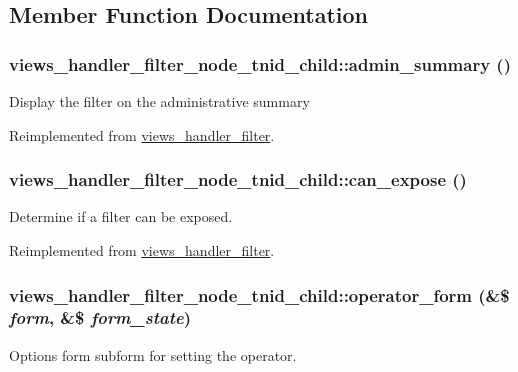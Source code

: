 \subsection{Member Function Documentation}
\hypertarget{classviews__handler__filter__node__tnid__child_a3762760577c3801276a683271be90e47}{
\subsubsection[{admin\_\-summary}]{\setlength{\rightskip}{0pt plus 5cm}views\_\-handler\_\-filter\_\-node\_\-tnid\_\-child::admin\_\-summary ()}}
\label{classviews__handler__filter__node__tnid__child_a3762760577c3801276a683271be90e47}
Display the filter on the administrative summary 

Reimplemented from \hyperlink{classviews__handler__filter_a655263cd0b73188eec064b9a9743fe4c}{views\_\-handler\_\-filter}.\hypertarget{classviews__handler__filter__node__tnid__child_a2c6527f01666eaf0ba38eff4798ec732}{
\subsubsection[{can\_\-expose}]{\setlength{\rightskip}{0pt plus 5cm}views\_\-handler\_\-filter\_\-node\_\-tnid\_\-child::can\_\-expose ()}}
\label{classviews__handler__filter__node__tnid__child_a2c6527f01666eaf0ba38eff4798ec732}
Determine if a filter can be exposed. 

Reimplemented from \hyperlink{classviews__handler__filter_af0e5810a2a2f194cd6af0fca9c858756}{views\_\-handler\_\-filter}.\hypertarget{classviews__handler__filter__node__tnid__child_ae0cfa82e361de74d4f24f820f5106117}{
\subsubsection[{operator\_\-form}]{\setlength{\rightskip}{0pt plus 5cm}views\_\-handler\_\-filter\_\-node\_\-tnid\_\-child::operator\_\-form (\&\$ {\em form}, \/  \&\$ {\em form\_\-state})}}
\label{classviews__handler__filter__node__tnid__child_ae0cfa82e361de74d4f24f820f5106117}
Options form subform for setting the operator.

